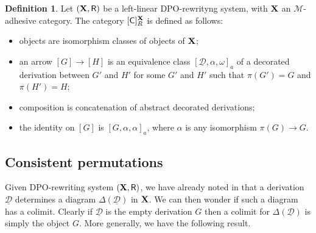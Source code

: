\documentclass[a4paper]{article}
\def\R{\mathsf{R}}
\def\X{\textbf {\textup{X}}}
\newcommand{\dder}[1]{\mathscr{#1}}
\newcommand{\der}[1]{\underline{\dder{#1}}}
\def\dpi{[\mathsf{C}]^{\X}_R}
\theoremstyle{definition}
\newtheorem{definition}[theorem]{Definition}
\begin{document}
\begin{definition}
	Let $(\X, \R)$ be a left-linear DPO-rewrityng system, with $\X$ an $\mathcal{M}$-adhesive category. The  category $\dpi$ is defined as follows:
	\begin{itemize}
		\item objects are isomorphism classes of objects of $\X$;
		\item an arrow $[G]\to [H]$ is an equivalence class $[\der{D}, \alpha, \omega]_a$ of a decorated derivation between $G'$ and $H'$ for some $G'$ and $H'$ such that $\pi(G')=G$ and $\pi(H')=H$;
		\item composition is concatenation of abstract decorated derivations;
		\item the identity on $[G]$ is $[G, \alpha, \alpha]_a$, where $\alpha$ is any isomorphism $\pi(G)\to G$.	\end{itemize}
\end{definition}


\subsection{Consistent permutations}

Given DPO-rewriting system $(\X, \R)$,  we have already noted in  that a derivation $\der{D}$  determines a diagram $\Delta(\der{D})$ in $\X$. We can then wonder if such a diagram has a colimit. Clearly if $\der{D}$ is the empty derivation $G$ then a colimit for $\Delta(\der{D})$ is simply the object $G$. More generally, we have the following result.
\end{document}

